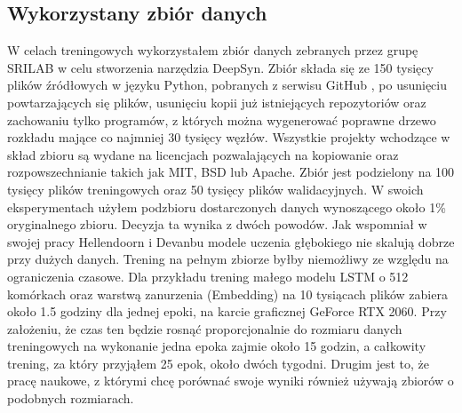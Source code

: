 \subsection {Wykorzystany zbiór danych}
\label{sec:dataset-background}
W celach treningowych wykorzystałem zbiór danych zebranych przez grupę SRILAB \cite{dataset} w celu stworzenia narzędzia 
DeepSyn. Zbiór składa się ze 150 tysięcy plików źródłowych w języku Python, pobranych z serwisu GitHub \cite{github}, po 
usunięciu powtarzających się plików, usunięciu kopii już istniejących repozytoriów oraz zachowaniu tylko programów, z których
można wygenerować poprawne drzewo rozkładu mające co najmniej 30 tysięcy węzłów. Wszystkie projekty wchodzące w skład 
zbioru są wydane na licencjach pozwalających na kopiowanie oraz rozpowszechnianie takich jak MIT, BSD lub Apache. Zbiór jest 
podzielony na 100 tysięcy plików treningowych oraz 50 tysięcy plików walidacyjnych. W swoich eksperymentach użyłem podzbioru 
dostarczonych danych wynoszącego około 1\% oryginalnego zbioru. Decyzja ta wynika z dwóch powodów. Jak wspomniał w swojej 
pracy Hellendoorn i Devanbu\cite{hellendoorn} modele uczenia głębokiego nie skalują dobrze przy dużych danych. Trening na 
pełnym zbiorze byłby niemożliwy ze względu na ograniczenia czasowe. Dla przykładu trening małego modelu LSTM o 512 komórkach 
oraz warstwą zanurzenia (Embedding) na 10 tysiącach plików zabiera około 1.5 godziny dla jednej epoki, na karcie graficznej GeForce RTX 2060. 
Przy założeniu, że czas ten będzie rosnąć proporcjonalnie do rozmiaru danych treningowych na wykonanie jedna epoka zajmie 
około 15 godzin, a całkowity trening, za który przyjąłem 25 epok, około dwóch tygodni. Drugim jest to, że pracę naukowe, z 
którymi chcę porównać swoje wyniki również używają zbiorów o podobnych rozmiarach. 


